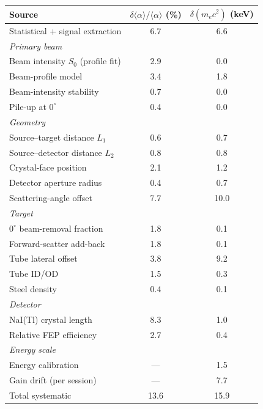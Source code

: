 \begin{tabular}{lcc}
\hline\hline
Source & $\delta\langle\alpha\rangle/\langle\alpha\rangle$ (\%) & $\delta(m_ec^2)$ (keV)\\
\hline
Statistical + signal extraction & 6.7 & 6.6\\
\multicolumn{3}{l}{\textit{Primary beam}}\\
\quad Beam intensity $S_0$ (profile fit) & 2.9 & 0.0\\
\quad Beam-profile model & 3.4 & 1.8\\
\quad Beam-intensity stability & 0.7 & 0.0\\
\quad Pile-up at $0^\circ$ & 0.4 & 0.0\\
\multicolumn{3}{l}{\textit{Geometry}}\\
\quad Source--target distance $L_1$ & 0.6 & 0.7\\
\quad Source--detector distance $L_2$ & 0.8 & 0.8\\
\quad Crystal-face position & 2.1 & 1.2\\
\quad Detector aperture radius & 0.4 & 0.7\\
\quad Scattering-angle offset & 7.7 & 10.0\\
\multicolumn{3}{l}{\textit{Target}}\\
\quad $0^\circ$ beam-removal fraction & 1.8 & 0.1\\
\quad Forward-scatter add-back & 1.8 & 0.1\\
\quad Tube lateral offset & 3.8 & 9.2\\
\quad Tube ID/OD & 1.5 & 0.3\\
\quad Steel density & 0.4 & 0.1\\
\multicolumn{3}{l}{\textit{Detector}}\\
\quad NaI(Tl) crystal length & 8.3 & 1.0\\
\quad Relative FEP efficiency & 2.7 & 0.4\\
\multicolumn{3}{l}{\textit{Energy scale}}\\
\quad Energy calibration & --- & 1.5\\
\quad Gain drift (per session) & --- & 7.7\\
\hline
Total systematic & 13.6 & 15.9\\
\hline\hline
\end{tabular}
